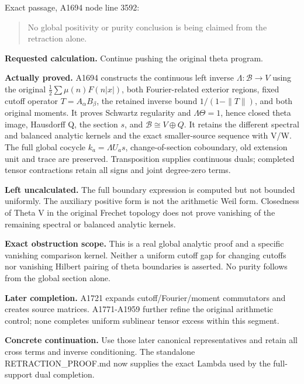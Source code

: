 Exact passage, A1694 node
\protect{} line 3592:

\begin{quote}
No global positivity or purity conclusion is being claimed from the
retraction alone.
\end{quote}

\textbf{Requested calculation.} Continue pushing the original theta
program.

\textbf{Actually proved.} A1694 constructs the continuous left inverse
\(\Lambda:\mathscr B\to V\) using the original
\(\frac12\sum\mu(n)F(n|x|)\), both Fourier-related exterior regions,
fixed cutoff operator \(T=A_\alpha B_\beta\), the retained inverse bound
\(1/(1-\|T\|)\), and both original moments. It proves Schwartz
regularity and \(\Lambda\Theta=1\), hence closed theta image, Hausdorff
Q, the section \(s\), and \(\mathscr B\cong V\oplus Q\). It retains the
different spectral and balanced analytic kernels and the exact
smaller-source sequence with V/W. The full global cocycle
\(k_a=\Lambda U_as\), change-of-section coboundary, old extension unit
and trace are preserved. Transposition supplies continuous duals;
completed tensor contractions retain all signs and joint degree-zero
terms.

\textbf{Left uncalculated.} The full boundary expression  is computed but not bounded uniformly. The auxiliary positive form is
not the arithmetic Weil form. Closedness of Theta V in the original
Frechet topology does not prove vanishing of the remaining spectral or
balanced analytic kernels.

\textbf{Exact obstruction scope.} This is a real global analytic proof
and a specific vanishing comparison kernel. Neither a uniform cutoff gap
for changing cutoffs nor vanishing Hilbert pairing of theta boundaries
is asserted. No purity follows from the global section alone.

\textbf{Later completion.} A1721 expands cutoff/Fourier/moment
commutators and creates source matrices. A1771-A1959 further refine the
original arithmetic control; none completes uniform sublinear tensor
excess within this segment.

\textbf{Concrete continuation.} Use those later canonical
representatives and retain all cross terms and inverse conditioning. The
standalone RETRACTION\_PROOF.md now supplies the exact Lambda used by
the full-support dual completion.

